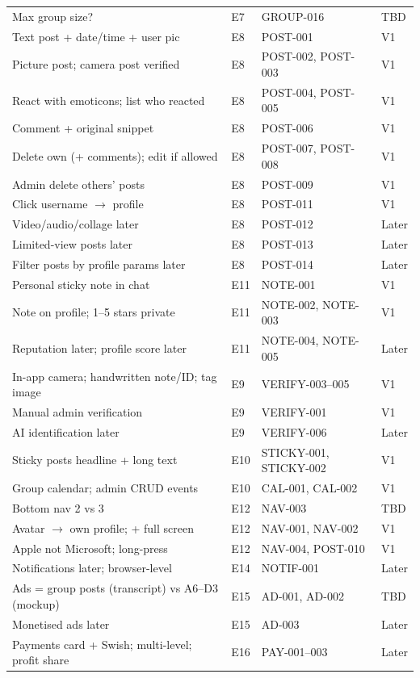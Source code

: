 \documentclass[11pt,a4paper]{article}
\begin{document}
\begin{longtable}{@{}p{5.8cm}p{2.0cm}p{3.4cm}p{2.4cm}@{}}
Max group size? & E7 & GROUP-016 & TBD \\
Text post + date/time + user pic & E8 & POST-001 & V1 \\
Picture post; camera post verified & E8 & POST-002, POST-003 & V1 \\
React with emoticons; list who reacted & E8 & POST-004, POST-005 & V1 \\
Comment + original snippet & E8 & POST-006 & V1 \\
Delete own (+ comments); edit if allowed & E8 & POST-007, POST-008 & V1 \\
Admin delete others' posts & E8 & POST-009 & V1 \\
Click username $\rightarrow$ profile & E8 & POST-011 & V1 \\
Video/audio/collage later & E8 & POST-012 & Later \\
Limited-view posts later & E8 & POST-013 & Later \\
Filter posts by profile params later & E8 & POST-014 & Later \\
Personal sticky note in chat & E11 & NOTE-001 & V1 \\
Note on profile; 1--5 stars private & E11 & NOTE-002, NOTE-003 & V1 \\
Reputation later; profile score later & E11 & NOTE-004, NOTE-005 & Later \\
In-app camera; handwritten note/ID; tag image & E9 & VERIFY-003--005 & V1 \\
Manual admin verification & E9 & VERIFY-001 & V1 \\
AI identification later & E9 & VERIFY-006 & Later \\
Sticky posts headline + long text & E10 & STICKY-001, STICKY-002 & V1 \\
Group calendar; admin CRUD events & E10 & CAL-001, CAL-002 & V1 \\
Bottom nav 2 vs 3 & E12 & NAV-003 & TBD \\
Avatar $\rightarrow$ own profile; + full screen & E12 & NAV-001, NAV-002 & V1 \\
Apple not Microsoft; long-press & E12 & NAV-004, POST-010 & V1 \\
Notifications later; browser-level & E14 & NOTIF-001 & Later \\
Ads = group posts (transcript) vs A6--D3 (mockup) & E15 & AD-001, AD-002 & TBD \\
Monetised ads later & E15 & AD-003 & Later \\
Payments card + Swish; multi-level; profit share & E16 & PAY-001--003 & Later \\

\end{longtable}
\end{document}

